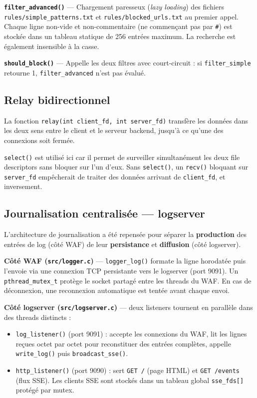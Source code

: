 \documentclass[12pt,a4paper]{article}
\begin{document}
\vspace{0.8em}

\textbf{\texttt{filter\_advanced()}} --- Chargement paresseux (\textit{lazy loading}) des fichiers \texttt{rules/simple\_patterns.txt} et \texttt{rules/blocked\_urls.txt} au premier appel. Chaque ligne non-vide et non-commentaire (ne commençant pas par \texttt{\#}) est stockée dans un tableau statique de 256 entrées maximum. La recherche est également insensible à la casse.

\textbf{\texttt{should\_block()}} --- Appelle les deux filtres avec court-circuit : si \texttt{filter\_simple} retourne 1, \texttt{filter\_advanced} n'est pas évalué.

\subsection{Relay bidirectionnel}

La fonction \texttt{relay(int client\_fd, int server\_fd)} transfère les données dans les deux sens entre le client et le serveur backend, jusqu'à ce qu'une des connexions soit fermée.

\texttt{select()} est utilisé ici car il permet de surveiller simultanément les deux file descriptors sans bloquer sur l'un d'eux. Sans \texttt{select()}, un \texttt{recv()} bloquant sur \texttt{server\_fd} empêcherait de traiter des données arrivant de \texttt{client\_fd}, et inversement.

\subsection{Journalisation centralisée --- logserver}

L'architecture de journalisation a été repensée pour séparer la \textbf{production} des entrées de log (côté WAF) de leur \textbf{persistance} et \textbf{diffusion} (côté logserver).

\textbf{Côté WAF (\texttt{src/logger.c})} --- \texttt{logger\_log()} formate la ligne horodatée puis l'envoie via une connexion TCP persistante vers le logserver (port 9091). Un \texttt{pthread\_mutex\_t} protège le socket partagé entre les threads du WAF. En cas de déconnexion, une reconnexion automatique est tentée avant chaque envoi.

\textbf{Côté logserver (\texttt{src/logserver.c})} --- deux listeners tournent en parallèle dans des threads distincts :

\begin{itemize}
  \item \texttt{log\_listener()} (port 9091) : accepte les connexions du WAF, lit les lignes reçues octet par octet pour reconstituer des entrées complètes, appelle \texttt{write\_log()} puis \texttt{broadcast\_sse()}.
  \item \texttt{http\_listener()} (port 9090) : sert \texttt{GET /} (page HTML) et \texttt{GET /events} (flux SSE). Les clients SSE sont stockés dans un tableau global \texttt{sse\_fds[]} protégé par mutex.
\end{itemize}
\end{document}

